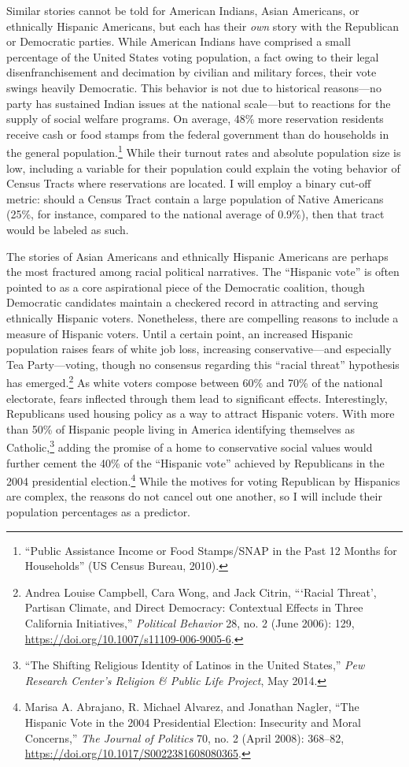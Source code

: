 \documentclass[12pt,oneside]{psthesis}
\begin{document}
Similar stories cannot be told for American Indians, Asian Americans, or ethnically Hispanic Americans, but each has their \emph{own} story with the Republican or Democratic parties.
While American Indians have comprised a small percentage of the United States voting population, a fact owing to their legal disenfranchisement and decimation by civilian and military forces, their vote swings heavily Democratic.
This behavior is not due to historical reasons---no party has sustained Indian issues at the national scale---but to reactions for the supply of social welfare programs.
On average, 48\% more reservation residents receive cash or food stamps from the federal government than do households in the general population.\footnote{``Public Assistance Income or Food Stamps/SNAP in the Past 12 Months for Households'' (US Census Bureau, 2010).}
While their turnout rates and absolute population size is low, including a variable for their population could explain the voting behavior of Census Tracts where reservations are located.
I will employ a binary cut-off metric: should a Census Tract contain a large population of Native Americans (25\%, for instance, compared to the national average of 0.9\%), then that tract would be labeled as such.

The stories of Asian Americans and ethnically Hispanic Americans are perhaps the most fractured among racial political narratives.
The ``Hispanic vote'' is often pointed to as a core aspirational piece of the Democratic coalition, though Democratic candidates maintain a checkered record in attracting and serving ethnically Hispanic voters.
Nonetheless, there are compelling reasons to include a measure of Hispanic voters.
Until a certain point, an increased Hispanic population raises fears of white job loss, increasing conservative---and especially Tea Party---voting, though no consensus regarding this ``racial threat'' hypothesis has emerged.\footnote{Andrea Louise Campbell, Cara Wong, and Jack Citrin, ```Racial Threat', Partisan Climate, and Direct Democracy: Contextual Effects in Three California Initiatives,'' \emph{Political Behavior} 28, no. 2 (June 2006): 129, \url{https://doi.org/10.1007/s11109-006-9005-6}.}
As white voters compose between 60\% and 70\% of the national electorate, fears inflected through them lead to significant effects.
Interestingly, Republicans used housing policy as a way to attract Hispanic voters.
With more than 50\% of Hispanic people living in America identifying themselves as Catholic,\footnote{``The Shifting Religious Identity of Latinos in the United States,'' \emph{Pew Research Center's Religion \& Public Life Project}, May 2014.} adding the promise of a home to conservative social values would further cement the 40\% of the ``Hispanic vote'' achieved by Republicans in the 2004 presidential election.\footnote{Marisa A. Abrajano, R. Michael Alvarez, and Jonathan Nagler, ``The Hispanic Vote in the 2004 Presidential Election: Insecurity and Moral Concerns,'' \emph{The Journal of Politics} 70, no. 2 (April 2008): 368--82, \url{https://doi.org/10.1017/S0022381608080365}.}
While the motives for voting Republican by Hispanics are complex, the reasons do not cancel out one another, so I will include their population percentages as a predictor.
\end{document}
